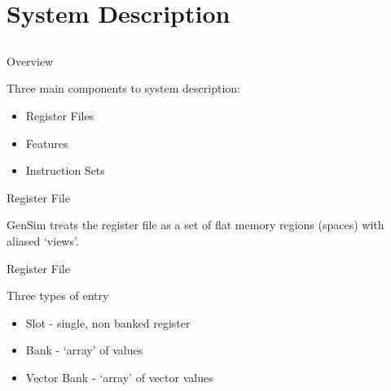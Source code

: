 \section{System Description}
\subsection{}

\begin{frame}{Overview}

Three main components to system description:
\begin{itemize}
\item Register Files
\item Features
\item Instruction Sets
\end{itemize}

\end{frame}

\begin{frame}{Register File}

GenSim treats the register file as a set of flat memory regions (spaces)
with aliased `views'.

\end{frame}

\begin{frame}{Register File}

Three types of entry
\begin{itemize}
\item Slot - single, non banked register
\item Bank - `array' of values
\item Vector Bank - `array' of vector values
\end{itemize}

\end{frame}

